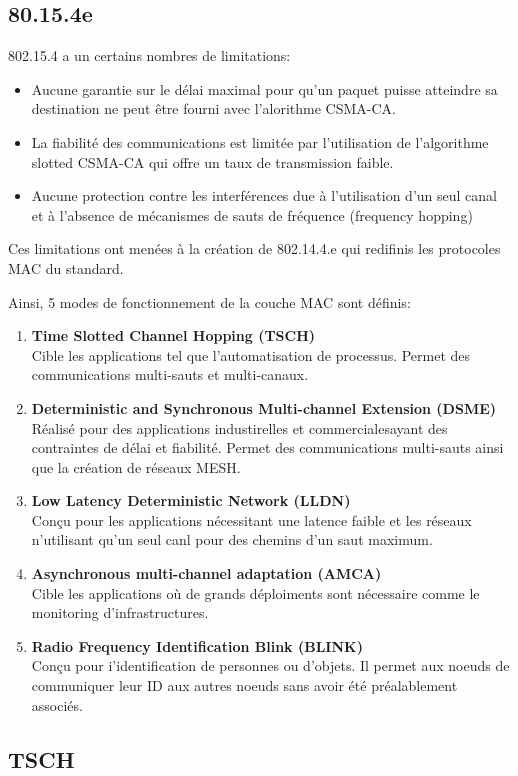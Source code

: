 \subsection{80.15.4e}\label{subsec:etat_art-802.15.4.limitations}
802.15.4 a un certains nombres de limitations:
\begin{itemize}
  \item Aucune garantie sur le délai maximal pour qu'un paquet puisse atteindre sa destination
    ne peut être fourni avec l'alorithme CSMA-CA.
  \item La fiabilité des communications est limitée par l'utilisation de l'algorithme slotted CSMA-CA
    qui offre un taux de transmission faible.
  \item Aucune protection contre les interférences due à l'utilisation d'un seul canal et à l'absence
    de mécanismes de sauts de fréquence (frequency hopping)
\end{itemize}
Ces limitations ont menées à la création de 802.14.4.e qui redifinis les protocoles MAC du standard.

Ainsi, 5 modes de fonctionnement de la couche MAC sont définis:
\begin{enumerate}
  \item \textbf{Time Slotted Channel Hopping (TSCH)}\\
    Cible les applications tel que l'automatisation de processus. Permet des communications multi-sauts
    et multi-canaux.
  \item \textbf{Deterministic and Synchronous Multi-channel Extension (DSME)}\\
    Réalisé pour des applications industirelles et commercialesayant des contraintes de délai et
    fiabilité. Permet des communications multi-sauts ainsi que la création de réseaux MESH.
  \item \textbf{Low Latency Deterministic Network (LLDN)}\\
    Conçu pour les applications nécessitant une latence faible et les réseaux n'utilisant qu'un seul
    canl pour des chemins d'un saut maximum.
  \item \textbf{Asynchronous multi-channel adaptation (AMCA)}\\
    Cible les applications où de grands déploiments sont nécessaire comme le monitoring d'infrastructures.
  \item \textbf{Radio Frequency Identification Blink (BLINK)}\\
    Conçu pour i'identification de personnes ou d'objets. Il permet aux noeuds de communiquer leur
    ID aux autres noeuds sans avoir été préalablement associés.
\end{enumerate}
\subsection{TSCH}\label{subsec:etat_art-802.15.4.tsch}